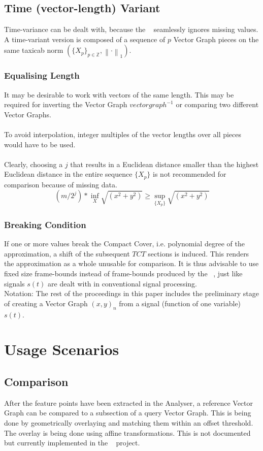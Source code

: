 \documentclass{report}
\newcommand\norm[1]{\left\lVert#1\right\rVert}
\begin{document}
\section{Time (vector-length) Variant}
Time-variance can be dealt with, because the ~\cite[Stopeight\_Analyzer.tex]{Analyzer} seamlessly ignores missing values. A time-variant version is composed of a sequence of $p$ Vector Graph pieces on the same taxicab norm $(\{X_{p}\}_{p\in \mathbb{Z}},\norm{\cdot}_1)$.
\subsection{Equalising Length}
It may be desirable to work with vectors of the same length. This may be required for inverting the Vector Graph $vectorgraph^{-1}$ or comparing two different Vector Graphs.\\\\
To avoid interpolation, integer multiples of the vector lengths over all pieces would have to be used.\\\\
Clearly, choosing a $j$ that results in a Euclidean distance smaller than the highest Euclidean distance in the entire sequence $\{X_{p}\}$ is not recommended for comparison because of missing data.
\begin{equation}
(m/2^j)*\inf \limits _{X} \sqrt{(x^2+y^2)} \geq \sup \limits _{\{X_{p}\}} \sqrt{(x^2+y^2)}\label{eq:4}
\end{equation}
\subsection{Breaking Condition}
If one or more values break the Compact Cover, i.e. polynomial degree of the approximation, a shift of the subsequent $TCT$ sections is induced. This renders the approximation as a whole unusable for comparison. It is thus advisable to use fixed size frame-bounds instead of frame-bounds produced by the ~\cite[Stopeight\_Analyzer.tex]{Analyzer}, just like signals $s(t)$ are dealt with in conventional signal processing.\\
Notation: The rest of the proceedings in this paper includes the preliminary stage of creating a Vector Graph $(x,y)_{n}$ from a signal (function of one variable) $s(t)$. 

\chapter{Usage Scenarios}
\section{Comparison}
After the feature points have been extracted in the Analyser, a reference Vector Graph can be compared to a subsection of a query Vector Graph. This is being done by geometrically overlaying and matching them within an offset threshold. The overlay is being done using affine transformations. This is not documented but currently implemented in the ~\cite[Stopeight\_Comparator.tex]{Analyzer} project.
\end{document}
